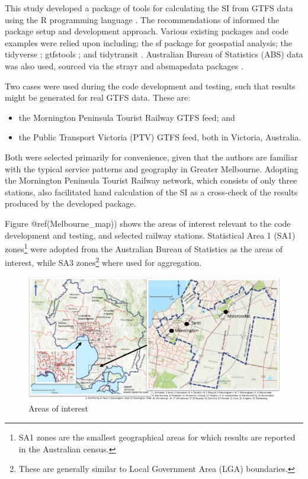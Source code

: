 \documentclass[preprint, 3p,
authoryear]{elsarticle} %
\begin{document}
This study developed a package of tools for calculating the SI from GTFS
data using the R programming language \citep{R-base}. The
recommendations of \citet{wickham2023r} informed the package setup and
development approach. Various existing packages and code examples were
relied upon including: the sf package \citep{R-sf} for geospatial
analysis; the tidyverse \citep{tidyverse2019}; gtfstools
\citep{R-gtfstools}; and tidytransit \citep{R-tidytransit}. Australian
Bureau of Statistics (ABS) data was also used, sourced via the strayr
and absmapsdata packages \citep{r-strayr}.

Two cases were used during the code development and testing, such that
results might be generated for real GTFS data. These are:

\begin{itemize}
\item
  the Mornington Peninsula Tourist Railway GTFS feed; and
\item
  the Public Transport Victoria (PTV) GTFS feed, both in Victoria,
  Australia.
\end{itemize}

Both were selected primarily for convenience, given that the authors are
familiar with the typical service patterns and geography in Greater
Melbourne. Adopting the Mornington Peninsula Tourist Railway network,
which consists of only three stations, also facilitated hand calculation
of the SI as a cross-check of the results produced by the developed
package.

Figure @ref(Melbourne\_map)) shows the areas of interest relevant to the
code development and testing, and selected railway stations. Statistical
Area 1 (SA1) zones\footnote{SA1 zones are the smallest geographical
  areas for which results are reported in the Australian census.} were
adopted from the Australian Bureau of Statistics \citep{ABSmaps} as the
areas of interest, while SA3 zones\footnote{These are generally similar
  to Local Government Area (LGA) boundaries.} where used for
aggregation.

\begin{figure}
\includegraphics[width=1\linewidth]{graphics/all_maps} \caption{Areas of interest}\label{fig:Melbourne_map}
\end{figure}
\end{document}
